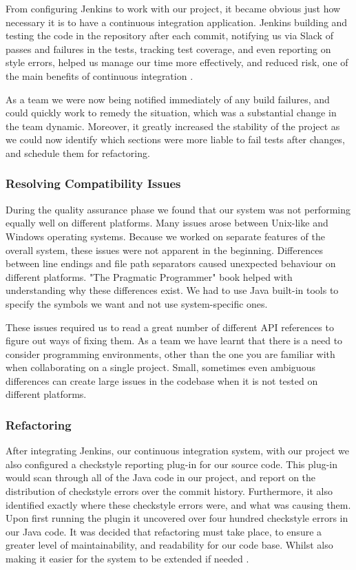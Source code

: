 \documentclass{l3proj}
\begin{document}
From configuring Jenkins to work with our project, it became obvious just how necessary it is to have a continuous integration application. Jenkins building and testing the code in the repository after each commit, notifying us via Slack of passes and failures in the tests, tracking test coverage, and even reporting on style errors, helped us manage our time more effectively, and reduced risk, one of the main benefits of continuous integration \cite{CI}.

As a team we were now being notified immediately of any build failures, and could quickly work to remedy the situation, which was a substantial change in the team dynamic. Moreover, it greatly increased the stability of the project as we could now identify which sections were more liable to fail tests after changes, and schedule them for refactoring.

\subsubsection{Resolving Compatibility Issues}
\label{sec:resolve_comp}
During the quality assurance phase we found that our system was not performing equally well on different platforms. Many issues arose between Unix-like and Windows operating systems. Because we worked on separate features of the overall system, these issues were not apparent in the beginning. Differences between line endings and file path separators caused unexpected behaviour on different platforms. "The Pragmatic Programmer" \cite{Basic-Tools} book helped with understanding why these differences exist. We had to use Java built-in tools to specify the symbols we want and not use system-specific ones.

These issues required us to read a great number of different API references to figure out ways of fixing them. As a team we have learnt that there is a need to consider programming environments, other than the one you are familiar with when collaborating on a single project. Small, sometimes even ambiguous differences can create large issues in the codebase when it is not tested on different platforms.

\subsubsection{Refactoring}
\label{sec:refactor_style}
After integrating Jenkins, our continuous integration system, with our project we also configured a checkstyle reporting plug-in for our source code. This plug-in would scan through all of the Java code in our project, and report on the distribution of checkstyle errors over the commit history. Furthermore, it also identified exactly where these checkstyle errors were, and what was causing them. Upon first running the plugin it uncovered over four hundred checkstyle errors in our Java code. It was decided that refactoring must take place, to ensure a greater level of maintainability, and readability for our code base. Whilst also making it easier for the system to be extended if needed \cite{Refactoring}.
\end{document}
